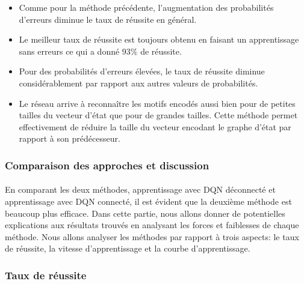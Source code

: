 \begin{itemize}
	\item Comme pour la méthode précédente, l'augmentation des probabilités d'erreurs diminue le taux de réussite en général.
	\item Le meilleur taux de réussite est toujours obtenu en faisant un apprentissage sans erreurs ce qui a donné $93\%$ de réussite.
	\item Pour des probabilités d'erreurs élevées, le taux de réussite diminue considérablement par rapport aux autres valeurs de probabilités.
	\item Le réseau arrive à reconnaître les motifs encodés aussi bien pour de petites tailles du vecteur d'état que pour de grandes tailles. Cette méthode permet effectivement de réduire la taille du vecteur encodant le graphe d'état par rapport à son prédécesseur.	
\end{itemize}

\subsubsection{Comparaison des approches et discussion}
\paragraph{}En comparant les deux méthodes, apprentissage avec DQN déconnecté et apprentissage avec DQN connecté, il est évident que la deuxième méthode est beaucoup plus efficace. Dans cette partie, nous allons donner de potentielles explications aux résultats trouvés en analysant les forces et faiblesses de chaque méthode. Nous allons analyser les méthodes par rapport à trois aspects: le taux de réussite, la vitesse d'apprentissage et la courbe d'apprentissage.
\subsubsection{Taux de réussite}\label{success_rate}
